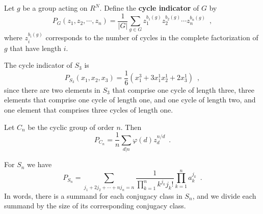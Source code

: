 \begin{definition}
	\cite[87]{Aigner2007}
	Let $g$ be a group acting on $R^N$. Define the \textbf{cycle indicator} of $G$ by
	\begin{equation}
		P_G(z_1, z_2, \cdots, z_n) = \frac{1}{|G|} \sum_{g \in G} z_1^{b_1(g)} z_2^{b_2(g)}
		\cdots z_n^{b_n(g)} \enspace,
	\end{equation}
	where $z_i^{b_i(g)}$ corresponds to the number of cycles in the complete factorization
	of $g$ that have length $i$.
\end{definition}

\begin{example}
	The cycle indicator of $S_3$ is
	\begin{equation}
		P_{S_3}(x_1, x_2, x_3) = \frac{1}{6}(x_1^3 + 3 x_1^1 x_2^1 + 2 x_3^1) \enspace,
	\end{equation}
	since there are two elements in $S_3$ that comprise one cycle of length three,
	three elements that comprise one cycle of length one, and one cycle of length two,
	and one element that comprises three cycles of length one.
\end{example}

\begin{example}
	Let $C_n$ be the cyclic group of order $n$. Then
	\begin{equation}
		P_{C_n} = \frac{1}{n} \sum_{d | n} \varphi(d) z_d^{n / d} \enspace.
	\end{equation}
\end{example}

\begin{example}
	For $S_n$ we have
	\begin{equation}
		P_{S_n} = \sum_{j_1 + 2j_2 + \cdots + nj_n = n}
		\frac{1}{\prod_{k = 1}^n k^{j_k} j_k!} \prod_{k = 1}^n a_k^{j_k} \enspace.
	\end{equation}
	In words, there is a summand for each conjugacy class in $S_n$, and we divide each
	summand by the size of its corresponding conjugacy class.
\end{example}

